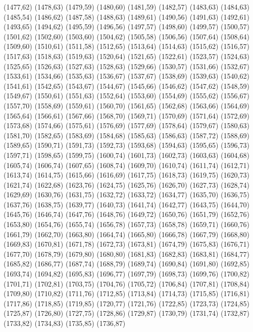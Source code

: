(1477,62)
(1478,63)
(1479,59)
(1480,60)
(1481,59)
(1482,57)
(1483,63)
(1484,63)
(1485,54)
(1486,62)
(1487,58)
(1488,63)
(1489,61)
(1490,56)
(1491,63)
(1492,61)
(1493,65)
(1494,62)
(1495,59)
(1496,56)
(1497,57)
(1498,60)
(1499,57)
(1500,57)
(1501,62)
(1502,60)
(1503,60)
(1504,62)
(1505,58)
(1506,56)
(1507,64)
(1508,64)
(1509,60)
(1510,61)
(1511,58)
(1512,65)
(1513,64)
(1514,63)
(1515,62)
(1516,57)
(1517,63)
(1518,63)
(1519,63)
(1520,64)
(1521,65)
(1522,61)
(1523,57)
(1524,63)
(1525,65)
(1526,63)
(1527,63)
(1528,63)
(1529,66)
(1530,57)
(1531,66)
(1532,67)
(1533,61)
(1534,66)
(1535,63)
(1536,67)
(1537,67)
(1538,69)
(1539,63)
(1540,62)
(1541,61)
(1542,65)
(1543,67)
(1544,67)
(1545,66)
(1546,62)
(1547,62)
(1548,59)
(1549,67)
(1550,61)
(1551,63)
(1552,64)
(1553,60)
(1554,69)
(1555,62)
(1556,67)
(1557,70)
(1558,69)
(1559,61)
(1560,70)
(1561,65)
(1562,68)
(1563,66)
(1564,69)
(1565,64)
(1566,61)
(1567,66)
(1568,70)
(1569,71)
(1570,69)
(1571,64)
(1572,69)
(1573,68)
(1574,66)
(1575,61)
(1576,69)
(1577,69)
(1578,64)
(1579,67)
(1580,63)
(1581,70)
(1582,65)
(1583,69)
(1584,68)
(1585,63)
(1586,63)
(1587,72)
(1588,69)
(1589,65)
(1590,71)
(1591,73)
(1592,73)
(1593,68)
(1594,63)
(1595,65)
(1596,73)
(1597,71)
(1598,65)
(1599,75)
(1600,74)
(1601,73)
(1602,73)
(1603,63)
(1604,68)
(1605,74)
(1606,74)
(1607,65)
(1608,74)
(1609,70)
(1610,74)
(1611,74)
(1612,71)
(1613,74)
(1614,75)
(1615,66)
(1616,69)
(1617,75)
(1618,73)
(1619,75)
(1620,73)
(1621,74)
(1622,68)
(1623,76)
(1624,75)
(1625,76)
(1626,70)
(1627,73)
(1628,74)
(1629,69)
(1630,76)
(1631,75)
(1632,72)
(1633,72)
(1634,77)
(1635,70)
(1636,75)
(1637,76)
(1638,75)
(1639,77)
(1640,73)
(1641,74)
(1642,77)
(1643,75)
(1644,70)
(1645,76)
(1646,74)
(1647,76)
(1648,76)
(1649,72)
(1650,76)
(1651,79)
(1652,76)
(1653,80)
(1654,76)
(1655,74)
(1656,78)
(1657,73)
(1658,78)
(1659,71)
(1660,76)
(1661,79)
(1662,70)
(1663,80)
(1664,74)
(1665,80)
(1666,78)
(1667,79)
(1668,80)
(1669,83)
(1670,81)
(1671,78)
(1672,73)
(1673,81)
(1674,79)
(1675,83)
(1676,71)
(1677,70)
(1678,79)
(1679,80)
(1680,80)
(1681,83)
(1682,83)
(1683,81)
(1684,77)
(1685,82)
(1686,77)
(1687,74)
(1688,79)
(1689,74)
(1690,84)
(1691,80)
(1692,85)
(1693,74)
(1694,82)
(1695,83)
(1696,77)
(1697,79)
(1698,73)
(1699,76)
(1700,82)
(1701,71)
(1702,81)
(1703,75)
(1704,76)
(1705,72)
(1706,84)
(1707,81)
(1708,84)
(1709,80)
(1710,82)
(1711,76)
(1712,85)
(1713,84)
(1714,73)
(1715,85)
(1716,81)
(1717,86)
(1718,85)
(1719,85)
(1720,77)
(1721,76)
(1722,85)
(1723,73)
(1724,85)
(1725,87)
(1726,80)
(1727,75)
(1728,86)
(1729,87)
(1730,79)
(1731,74)
(1732,87)
(1733,82)
(1734,83)
(1735,85)
(1736,87)
